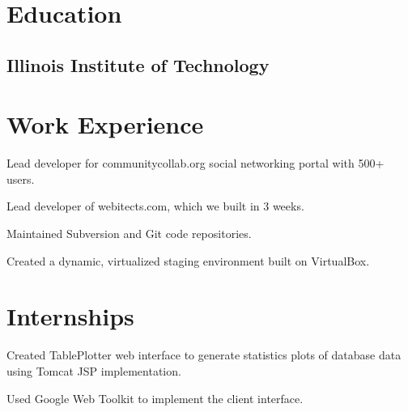 \documentclass{resume}
\begin{document}
\author{Dmitry Ratnikov}
\maketitle

\section{Education}

\subsection{Illinois Institute of Technology}


\section{Work Experience}

\begin{compactitem}
  \item Lead developer for communitycollab.org social networking portal with 500+ users.
  \item Lead developer of webitects.com, which we built in 3 weeks.
  \item Maintained Subversion and Git code repositories.
  \item Created a dynamic, virtualized staging environment built on VirtualBox.
\end{compactitem}

\section{Internships}

\begin{compactitem}
  \item Created TablePlotter web interface to generate statistics plots of database data using Tomcat JSP implementation.
  \item Used Google Web Toolkit to implement the client interface.
\end{compactitem}
\end{document}
